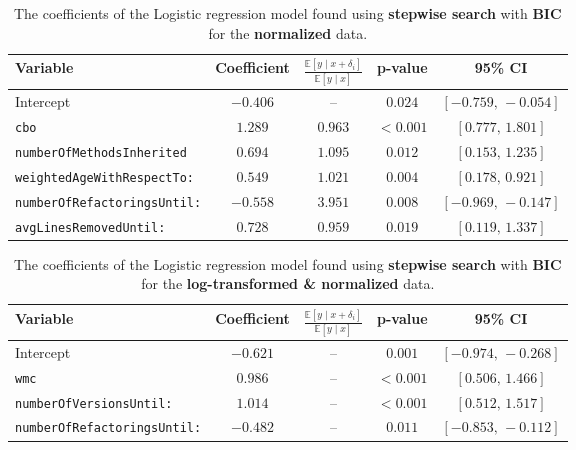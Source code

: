 \begin{table}[htbp]
    \centering
    \begin{tabular}{l c c c c}
        \toprule
        \textbf{Variable} & \textbf{Coefficient} & $\frac{\mathbb{E}[y\mid x+\delta_i]}{\mathbb{E}[y\mid x]}$ & \textbf{p-value} & \textbf{95\% CI} \\
        \midrule
        Intercept & $-0.406$ & -- & $0.024$ & $[-0.759,\,-0.054]$ \\
        \texttt{cbo} & $1.289$ & $0.963$ & $<0.001$ & $[0.777,\,1.801]$ \\
        \texttt{numberOfMethodsInherited} & $0.694$ & $1.095$ & $0.012$ & $[0.153,\,1.235]$ \\
        \texttt{weightedAgeWithRespectTo:} & $0.549$ & $1.021$ & $0.004$ & $[0.178,\,0.921]$ \\
        \texttt{numberOfRefactoringsUntil:} & $-0.558$ & $3.951$ & $0.008$ & $[-0.969,\,-0.147]$ \\
        \texttt{avgLinesRemovedUntil:} & $0.728$ & $0.959$ & $0.019$ & $[0.119,\,1.337]$ \\
        \bottomrule
    \end{tabular}
    \caption{The coefficients of the Logistic regression model found using \textbf{stepwise search} with \textbf{BIC} for the \textbf{normalized} data.}
    \label{tab:coef_stepwise_logistic_normalized}
\end{table}

\begin{table}[htbp]
    \centering
    \begin{tabular}{l c c c c}
        \toprule
        \textbf{Variable} & \textbf{Coefficient} & $\frac{\mathbb{E}[y\mid x+\delta_i]}{\mathbb{E}[y\mid x]}$ & \textbf{p-value} & \textbf{95\% CI} \\
        \midrule
        Intercept & $-0.621$ & -- & $0.001$ & $[-0.974,\,-0.268]$ \\
        \texttt{wmc} & $0.986$ & -- & $<0.001$ & $[0.506,\,1.466]$ \\
        \texttt{numberOfVersionsUntil:} & $1.014$ & -- & $<0.001$ & $[0.512,\,1.517]$ \\
        \texttt{numberOfRefactoringsUntil:} & $-0.482$ & -- & $0.011$ & $[-0.853,\,-0.112]$ \\
        \bottomrule
    \end{tabular}
    \caption{The coefficients of the Logistic regression model found using \textbf{stepwise search} with \textbf{BIC} for the \textbf{log-transformed \& normalized} data.}
    \label{tab:coef_stepwise_logistic_log_transform}
\end{table}

